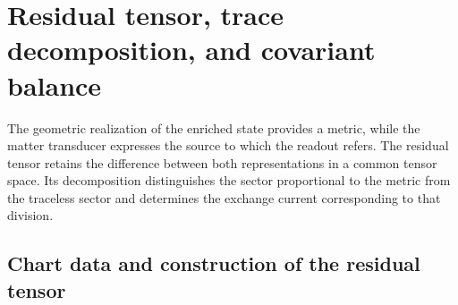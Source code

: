 %

\section{Residual tensor, trace decomposition, and covariant balance}
\label{vii:sec:tensor-residual-balance}

The geometric realization of the enriched state provides a metric,
while the matter transducer expresses the source to which the readout
refers. The residual tensor retains the difference between both
representations in a common tensor space. Its decomposition distinguishes
the sector proportional to the metric from the traceless sector and
determines the exchange current corresponding to that division.

\subsection{Chart data and construction of the residual tensor}
\label{vii:subsec:datos-tensor-residual}

